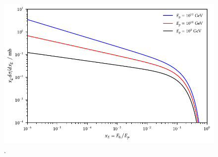\begin{figure}[H]
	\centering
	\includegraphics{../plots/build/charm_hadron_cross_section.pdf}
	\caption[Inclusive differential cross section for $p \kern-0.1pt p \kern+0.6pt \rightarrow D^0 X \kern+0.5pt$ production.]{.}
	\label{fig:charm-hadron-cross-section}
\end{figure}
